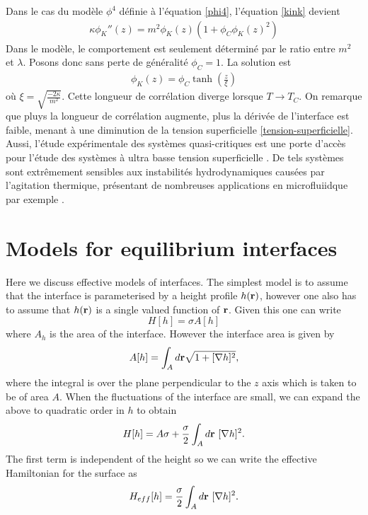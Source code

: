 Dans le cas du modèle $\phi^4$ définie à l'équation \ref{phi4}, l'équation \ref{kink} devient
\begin{align}
    \kappa \phi_K''(z) = m^2 \phi_K(z) \left( 1 + \phi_C \phi_K(z) ^2 \right)
       \label{eq-interface-glauber}
\end{align}
Dans le modèle, le comportement est seulement déterminé par le ratio entre $m^2$ et $\lambda$. Posons donc sans perte de généralité $\phi_C = 1$. La solution est  
\begin{align}
    \phi_K(z) = \phi_C \tanh \left( \frac{z}{\xi} \right)
       \label{profil-interface-glauber}    
\end{align}
où $\xi = \sqrt{\frac{-2 \kappa}{m^2}}$. Cette longueur de corrélation diverge lorsque $T \to T_C$. On remarque que pluys la longueur de corrélation augmente, plus la dérivée de l'interface est faible, menant à une diminution de la tension superficielle \ref{tension-superficielle}. Aussi, l'étude expérimentale des systèmes quasi-critiques est une porte d'accès pour l'étude des systèmes à ultra basse tension superficielle \cite{hennequin_drop_2006}. De tels systèmes sont extrêmement sensibles aux instabilités hydrodynamiques causées par l'agitation thermique, présentant de nombreuses applications en microfluiidque par exemple \cite{atencia_controlled_2005}. 


\section{Models for equilibrium interfaces}

Here we discuss effective models of interfaces. The simplest model is to assume that the 
interface is parameterised by a height profile $h({\bf r})$, however one also has to assume that 
$h({\bf r})$ is a single valued function of ${\bf r}$. Given this one can write
\begin{equation}
    H[h] = \sigma A[h]
\end{equation}
where $A_h$ is the area of the interface. However the interface area is given by
\begin{equation}
    A[h] = \int_A d{\bf r}\sqrt{1+[\nabla h]^2},
\end{equation}
where the integral is over the plane perpendicular to the $z$ axis which is taken to be of area $A$. When the fluctuations of the interface are small, we can expand the above to quadratic order in $h$ to obtain
\begin{equation}
    H[h]= A\sigma +\frac{\sigma}{2} \int_A d{\bf r} \ [\nabla h]^2.
\end{equation}
The first term is independent of the height so we can write the effective Hamiltonian for the surface as
\begin{equation}
    H_{eff} [h]= \frac{\sigma}{2} \int_A d{\bf r}\  [\nabla h]^2.
    \label{heff}
\end{equation}

